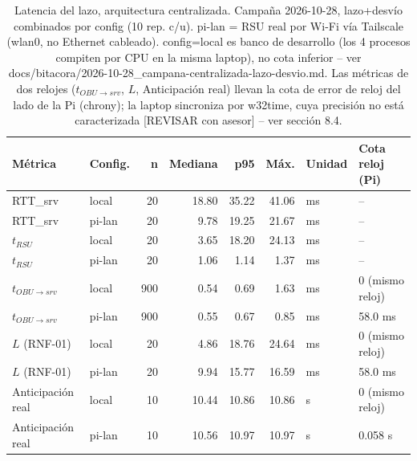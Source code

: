 \begin{table}[H]
\centering
\caption{Latencia del lazo, arquitectura centralizada. Campaña 2026-10-28, lazo+desvío combinados por config (10 rep. c/u). pi-lan = RSU real por Wi-Fi vía Tailscale (wlan0, no Ethernet cableado). config=local es banco de desarrollo (los 4 procesos compiten por CPU en la misma laptop), no cota inferior -- ver docs/bitacora/2026-10-28_campana-centralizada-lazo-desvio.md. Las métricas de dos relojes ($t_{OBU\to srv}$, $L$, Anticipación real) llevan la cota de error de reloj del lado de la Pi (chrony); la laptop sincroniza por w32time, cuya precisión no está caracterizada [REVISAR con asesor] -- ver sección 8.4.}
\label{tab:latencia_campana_centralizada}
\small
\begin{tabular}{llrrrrll}
\toprule
\textbf{Métrica} & \textbf{Config.} & \textbf{n} & \textbf{Mediana} & \textbf{p95} & \textbf{Máx.} & \textbf{Unidad} & \textbf{Cota reloj (Pi)} \\
\midrule
RTT\_srv & local & 20 & 18.80 & 35.22 & 41.06 & ms & -- \\
RTT\_srv & pi-lan & 20 & 9.78 & 19.25 & 21.67 & ms & -- \\
$t_{RSU}$ & local & 20 & 3.65 & 18.20 & 24.13 & ms & -- \\
$t_{RSU}$ & pi-lan & 20 & 1.06 & 1.14 & 1.37 & ms & -- \\
$t_{OBU\to srv}$ & local & 900 & 0.54 & 0.69 & 1.63 & ms & 0 (mismo reloj) \\
$t_{OBU\to srv}$ & pi-lan & 900 & 0.55 & 0.67 & 0.85 & ms & 58.0 ms \\
$L$ (RNF-01) & local & 20 & 4.86 & 18.76 & 24.64 & ms & 0 (mismo reloj) \\
$L$ (RNF-01) & pi-lan & 20 & 9.94 & 15.77 & 16.59 & ms & 58.0 ms \\
Anticipación real & local & 10 & 10.44 & 10.86 & 10.86 & s & 0 (mismo reloj) \\
Anticipación real & pi-lan & 10 & 10.56 & 10.97 & 10.97 & s & 0.058 s \\
\bottomrule
\end{tabular}
\end{table}

